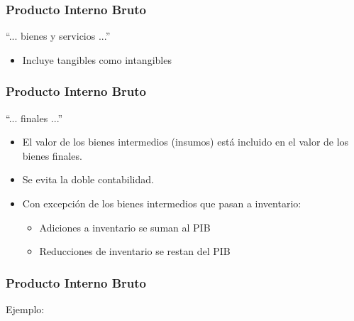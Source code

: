 \documentclass[dvipsnames,table,leqno]{beamer}
\begin{document}
		\begin{frame}
			\frametitle{Producto Interno Bruto}
			``... bienes y servicios ...''
			\begin{itemize}
				\item Incluye tangibles como intangibles
			\end{itemize}
		\end{frame}

		\begin{frame}
			\frametitle{Producto Interno Bruto}
			``... finales ...''
			\begin{itemize}
				\item El valor de los bienes intermedios (insumos) está incluido en el valor de los bienes finales.
				\item Se evita la doble contabilidad.
				\item Con excepción de los bienes intermedios que pasan a inventario:
					\begin{itemize}
						\item Adiciones a inventario se suman al PIB
						\item Reducciones de inventario se restan del PIB
					\end{itemize}
			\end{itemize}
		\end{frame}

		\begin{frame}
			\frametitle{Producto Interno Bruto}
			Ejemplo:
			\begin{table}[htbp!]
				\centering
			\end{table}
		\end{frame}	
\end{document}
